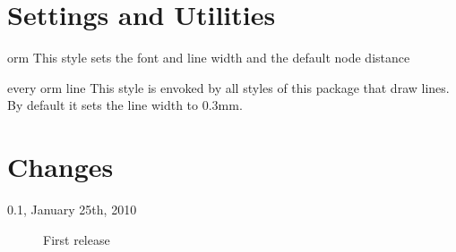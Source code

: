 \documentclass[a4paper,10pt]{article}
\def\ormVersion{0.1}
\def\ormDate{January 25th, 2010}
\newif\ifappendix
\begin{document}
\section{Settings and Utilities}
\label{sec:generalstyles}

\begin{stylekey}{orm}
  This style sets the font and line width and the default node distance
\end{stylekey}

\begin{stylekey}{every orm line}
  This style is envoked by all styles of this package that draw lines. By default it sets the line width to 0.3mm.
\end{stylekey}



\section*{Changes}

\begin{description}
  \item[\ormVersion, \ormDate]
    First release
\end{description}

\ifappendix
  
  \addcontentsline{toc}{section}{References}
  
  \addcontentsline{toc}{section}{Index}
  \printindex
\fi
\end{document}
